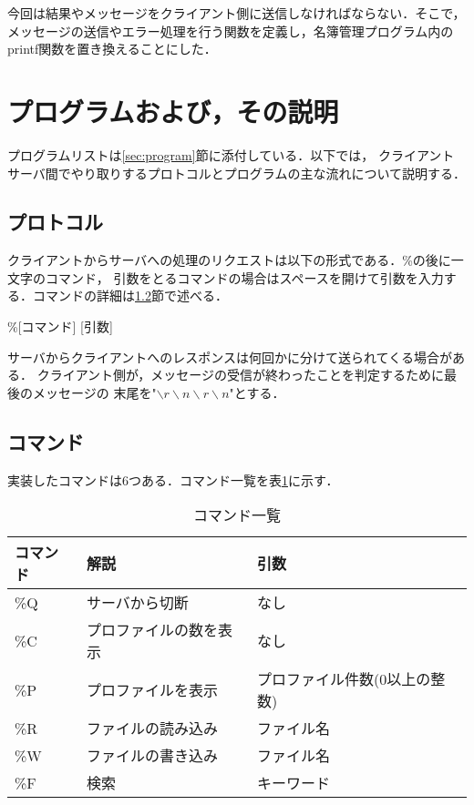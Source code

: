 \documentclass[11pt]{jarticle}
\begin{document}
今回は結果やメッセージをクライアント側に送信しなければならない．そこで，
メッセージの送信やエラー処理を行う関数を定義し，名簿管理プログラム内のprintf関数を置き換えることにした．

\section{プログラムおよび，その説明}

プログラムリストは\ref{sec:program}節に添付している．以下では，
クライアントサーバ間でやり取りするプロトコルとプログラムの主な流れについて説明する．

\subsection{プロトコル}

クライアントからサーバへの処理のリクエストは以下の形式である．\%の後に一文字のコマンド，
引数をとるコマンドの場合はスペースを開けて引数を入力する．コマンドの詳細は\ref{sec:command}節で述べる．
\begin{center}
    \%[コマンド] [引数]
\end{center}

サーバからクライアントへのレスポンスは何回かに分けて送られてくる場合がある．
クライアント側が，メッセージの受信が終わったことを判定するために最後のメッセージの
末尾を"$\backslash r\backslash n\backslash r\backslash n$"とする．

\subsection{コマンド} \label{sec:command}

実装したコマンドは6つある．コマンド一覧を表\ref{table:command}に示す．

\begin{table}[h] \caption{コマンド一覧} \label{table:command}
    \begin{center}
        \begin{tabular}{l|l|l} \hline
            コマンド & 解説 & 引数 \\ \hline \hline
            \%Q & サーバから切断 & なし \\ 
            \%C & プロファイルの数を表示 & なし \\ 
            \%P & プロファイルを表示 & プロファイル件数(0以上の整数) \\
            \%R & ファイルの読み込み & ファイル名 \\
            \%W & ファイルの書き込み & ファイル名 \\
            \%F & 検索 & キーワード \\ \hline
        \end{tabular}
    \end{center}
\end{table}
\end{document}
